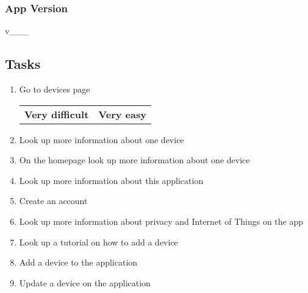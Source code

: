 \subsubsection*{App Version}

v\_\_\_

\subsection*{Tasks}

\begin{enumerate}
    \item Go to devices page \\
    \hspace*{0.46\textwidth}%
    \begin{tabularx}{0.2\textwidth}{@{}LR@{}}
        \textbf{\small Very difficult} & \textbf{\small Very easy}
    \end{tabularx}
    \begin{enumerate}
    \end{enumerate}
    \item Look up more information about one device
    \begin{enumerate}
    \end{enumerate}
    \item On the homepage look up more information about one device
    \begin{enumerate}
    \end{enumerate}
    \item Look up more information about this application
    \begin{enumerate}
    \end{enumerate}
    \item Create an account
    \begin{enumerate}
    \end{enumerate}
    \item Look up more information about privacy and Internet of Things on the app
    \begin{enumerate}
    \end{enumerate}
    \item Look up a tutorial on how to add a device
    \begin{enumerate}
    \end{enumerate}
    \item Add a device to the application
    \begin{enumerate}
    \end{enumerate}
    \item Update a device on the application
    \begin{enumerate}
    \end{enumerate}
\end{enumerate}

